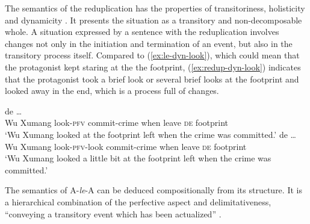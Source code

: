 The semantics of the reduplication has the properties of transitoriness,  holisticity  and dynamicity \citetext{\citealp[70--79]{Dai1997}; \citealp[155--159]{XiaoMcEnery2004}}.
It presents the situation as a  transitory and non\hyp{}decomposable whole.
A situation expressed by a sentence with the reduplication involves changes not only in the initiation and termination of an event, but also in the transitory process itself.
Compared to (\ref{ex:le-dyn-look}), which could mean that the protagonist kept staring at the the footprint,
(\ref{ex:redup-dyn-look}) indicates that the protagonist took a brief look or several brief looks at the footprint and looked away in the end, which is a process full of changes.

\settowidth{}

\ea
  \ea\label{ex:le-dyn-look}
    \gll {}      de  \ldots\\ 
    Wu Xumang look-\textsc{pfv} commit-crime when leave \textsc{de} footprint\\ 
    \glt `Wu Xumang looked at the footprint left when the crime was committed.'
  \ex\label{ex:redup-dyn-look}
    \gll  {}      de  \ldots\\
    Wu Xumang look-\textsc{pfv}-look commit-crime when leave \textsc{de} footprint\\ 
    \glt `Wu Xumang looked a little bit at the footprint left when the crime was committed.'
  \z
\z

The semantics of A-\textit{le}-A can be deduced compositionally from its structure. 
It is a hierarchical combination of the perfective aspect and delimitativeness, ``conveying a transitory event which has been actualized'' \citep[151]{XiaoMcEnery2004}.


